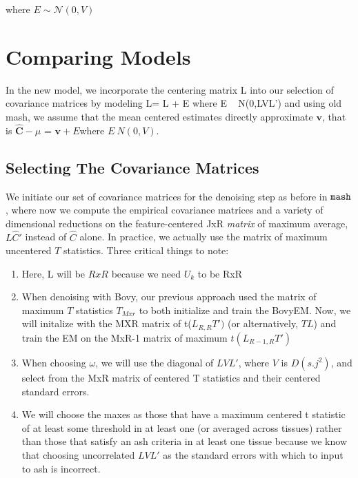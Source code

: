 \documentclass[11pt, oneside]{article}   	%
\newcommand{\Norm}{{\mathcal{N}}} %
\newcommand{\chat}{\bm{\hat{C}}}
\newcommand{\vb}{\bm{v}}
\def\mash{{\tt mash}}
\begin{document}
\begin{itemize}
where $E \sim \Norm (0, V)$


\section{Comparing Models}


In the new model, we incorporate the centering matrix L into our selection of covariance matrices by modeling L\chat = L \vb + E where E ~ N(0,LVL') and using old mash, we assume that the mean centered estimates directly approximate $\vb$, that is $\chat-\mu$ = $\vb + E $where $E ~ N(0,V)$. 


\subsection{Selecting The Covariance Matrices}

We initiate our set of covariance matrices for the denoising step as before in $\mash$, where now we compute the empirical covariance matrices and a variety of dimensional reductions on the feature-centered JxR \textit{matrix} of maximum average, $L \hat{C}' $ instead of $\hat{C}$ alone. In practice, we actually use the matrix of maximum uncentered $T$ statistics. Three critical things to note:

\begin{enumerate}
\item Here, L will be $RxR$ because we need $U_{k}$ to be RxR
\item When denoising with Bovy, our previous approach used the matrix of maximum $T$ statistics $T_{Mxr}$ to both initialize and train the BovyEM. Now, we will initalize with the MXR matrix of t($L_{R,R}T')$ (or alternatively, $TL$) and train the EM on the MxR-1 matrix of maximum $t(L_{R-1,R}T')$
\item When choosing $\omega$, we will use the diagonal of $L V L'$, where $V$ is $D(s.j^2)$, and select from the MxR matrix of centered T statistics and their centered standard errors.
\item We will choose the maxes as those that have a maximum centered t statistic of at least some threshold in at least one (or averaged across tissues) rather than those that satisfy an ash criteria in at least one tissue because we know that choosing uncorrelated $L V L'$ as the standard errors with which to input to ash  is incorrect.
\end{enumerate}



\end{itemize}
\end{document}
